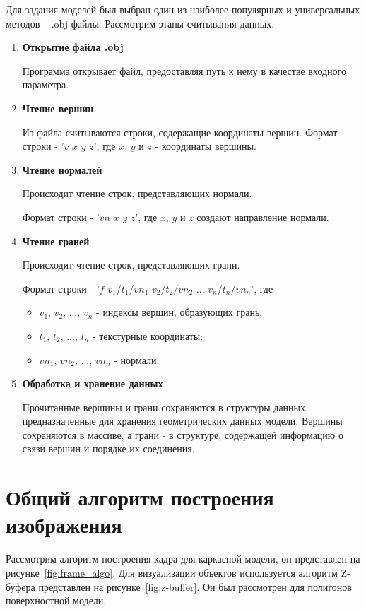 Для задания моделей был выбран один из наиболее популярных и универсальных методов – .obj файлы. 
Рассмотрим этапы считывания данных.
\begin{enumerate}
	\item \textbf{Открытие файла .obj}
	
	Программа открывает файл, предоставляя путь к нему в качестве входного параметра.
	
	\item \textbf{Чтение вершин}
	
	Из файла считываются строки, содержащие координаты вершин. 
	Формат строки - '$v$ $x$ $y$ $z$', где $x$, $y$ и $z$ - координаты вершины.
	
	\item \textbf{Чтение нормалей}
	
	Происходит чтение строк, представляющих нормали. 
	
	Формат строки - '$vn$ $x$ $y$ $z$', где $x$, $y$ и $z$ создают направление нормали.
	
	\item \textbf{Чтение граней}
	
	Происходит чтение строк, представляющих грани. 
	
	Формат строки - '$f$ $v_1$/$t_1$/$vn_1$ $v_2$/$t_2$/$vn_2$ ... $v_n$/$t_n$/$vn_n$', где 
	\begin{itemize}
		\item $v_1$, $v_2$, ..., $v_n$ - индексы вершин, образующих грань;
		\item $t_1$, $t_2$, ..., $t_n$ - текстурные координаты;
		\item $vn_1$, $vn_2$, ..., $vn_n$ - нормали.
	\end{itemize}
	
	\item \textbf{Обработка и хранение данных}
	
	Прочитанные вершины и грани сохраняются в структуры данных, предназначенные для хранения геометрических данных 
	модели. 
	Вершины сохраняются в массиве, а грани - в структуре, содержащей информацию о связи вершин и порядке их соединения.
	
\end{enumerate}


\section{Общий алгоритм построения изображения}
Рассмотрим алгоритм построения кадра для каркасной модели, он представлен на рисунке~\ref{fig:frame_algo}. 
Для визуализации объектов используется алгоритм Z-буфера представлен на рисунке~\ref{fig:z-buffer}.
Он был рассмотрен для полигонов поверхностной модели.


